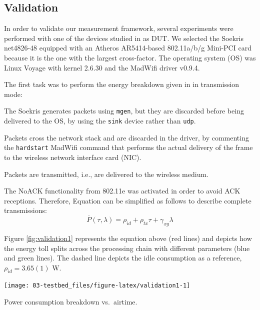 \documentclass[twoside,nohyper]{tufte-book}
\makeatletter
\providecommand{\tightlist}{%
  \setlength{\itemsep}{0pt}\setlength{\parskip}{0pt}}
\let\orig@maketag@@@\maketag@@@
\renewcommand{\eqref}[1]{\textup{\let\maketag@@@\orig@maketag@@@\tagform@{\ref{#1}}}}
\def\maketag@@@#1{\hbox{\rlap{\kern\marginparsep\m@th\normalfont#1}\kern1sp}}
\theoremstyle{definition}
\theoremstyle{definition}
\theoremstyle{definition}
\theoremstyle{remark}
\makeatother
\begin{document}
\hypertarget{validation}{%
\subsection{Validation}\label{validation}}

In order to validate our measurement framework, several experiments were
performed with one of the devices studied in \citet{Serrano2014} as DUT.
We selected the Soekris net4826-48 equipped with an Atheros AR5414-based
802.11a/b/g Mini-PCI card because it is the one with the largest
cross-factor. The operating system (OS) was Linux Voyage with kernel
2.6.30 and the MadWifi driver v0.9.4.

The first task was to perform the energy breakdown given in
\citet{Serrano2014} in transmission mode:

\begin{description}
\tightlist
\item[User space]
The Soekris generates packets using \texttt{mgen}, but they are
discarded before being delivered to the OS, by using the \texttt{sink}
device rather than \texttt{udp}.
\item[Kernel space]
Packets cross the network stack and are discarded in the driver, by
commenting the \texttt{hardstart} MadWifi command that performs the
actual delivery of the frame to the wireless network interface card
(NIC).
\item[Wireless NIC]
Packets are transmitted, i.e., are delivered to the wireless medium.
\end{description}

The NoACK functionality from 802.11e was activated in order to avoid ACK
receptions. Therefore, Equation \eqref{eq:new-energy-model} can be
simplified as follows to describe complete transmissions:
%
\begin{equation*}
 \overline{P}(\tau, \lambda) = \rho_{id} + \rho_{tx}\tau + \gamma_{xg}\lambda
 \label{eq:validation1}
\end{equation*}
%


Figure \ref{fig:validation1} represents the equation above (red lines)
and depicts how the energy toll splits across the processing chain with
different parameters (blue and green lines). The dashed line depicts the
idle consumption as a reference, \(\rho_{id}=3.65(1)\) W.





\begin{marginfigure}[-3.5in]

{\centering \texttt{[image: 03-testbed\_files/figure-latex/validation1-1]} 

}

\caption[Power consumption breakdown vs.~airtime.]{Power consumption breakdown vs.~airtime.}\label{fig:validation1}
\end{marginfigure}
\end{document}
